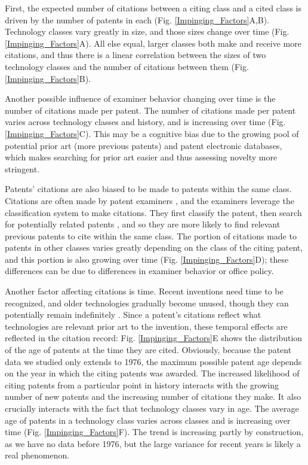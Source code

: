 \documentclass[]{svjour3}
\begin{document}
First, the expected number of citations between a citing class and a cited class is driven by the number of patents in each (Fig. \ref{Impinging_Factors}A,B). Technology classes vary greatly in size, and those sizes change over time (Fig. \ref{Impinging_Factors}A). All else equal, larger classes both make and receive more citations, and thus there is a linear correlation between the sizes of two technology classes and the number of citations between them (Fig. \ref{Impinging_Factors}B).

Another possible influence of examiner behavior changing over time is the number of citations made per patent. The number of citations made per patent varies across technology classes and history, and is increasing over time (Fig. \ref{Impinging_Factors}C). This may be a cognitive bias due to the growing pool of potential prior art (more previous patents) and patent electronic databases, which makes searching for prior art easier and thus assessing novelty more stringent.  

Patents' citations are also biased to be made to patents within the same class. Citations are often made by patent examiners \citep{Criscuolo2008, Alcacer2006}, and the examiners leverage the classification system to make citations. They first classify the patent, then search for potentially related patents \citep{2014}, and so they are more likely to find relevant previous patents to cite within the same class. The portion of citations made to patents in other classes varies greatly depending on the class of the citing patent, and this portion is also growing over time (Fig. \ref{Impinging_Factors}D); these differences can be due to differences in examiner behavior or office policy. 

Another factor affecting citations is time. Recent inventions need time to be recognized, and older technologies gradually become unused, though they can potentially remain indefinitely \citep{Hall2001,Valverde2007}. Since a patent's citations reflect what technologies are relevant prior art to the invention, these temporal effects are reflected in the citation record: Fig. \ref{Impinging_Factors}E shows the distribution of the age of patents at the time they are cited. Obviously, because the patent data we studied only extends to 1976, the maximum possible patent age depends on the year in which the citing patents was awarded.
The increased likelihood of citing patents from a particular point in history interacts with the growing number of new patents and the increasing number of citations they make. It also crucially interacts with the fact that technology classes vary in age. The average age of patents in a technology class varies across classes and is increasing over time (Fig. \ref{Impinging_Factors}F). The trend is increasing partly by construction, as we have no data before 1976, but the large variance for recent years is likely a real phenomenon.
\end{document}
